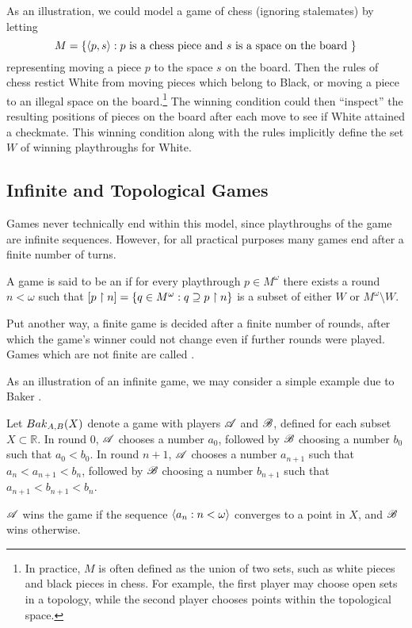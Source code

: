 As an illustration, we could model a game of chess (ignoring stalemates)
by letting
\[
  M = \{\langle p,s\rangle: p \text{ is a chess piece and }
                 s \text{ is a space on the board } \}
\]
representing moving a piece $p$ to the space $s$ on the board. Then the
rules of chess restict White from moving pieces which belong to
Black, or moving a piece to an illegal space on the board.\footnote{
  In practice, $M$ is often defined as the union of two sets, such
  as white pieces and black pieces in chess. For example,
  the first player may choose open sets in a topology, while the second player
  chooses points within the topological space.
}
The winning condition could then
``inspect'' the resulting positions of pieces on the board after each move
to see if White attained a
checkmate. This winning condition along with the rules implicitly define the
set $W$ of winning playthroughs for White.


\subsection{Infinite and Topological Games}

Games never technically end within this model, since
playthroughs of the game are infinite sequences. However, for all practical
purposes many games end after a finite number of turns.

\begin{defn}
  A game is said to be an  if for every playthrough
  $p\in M^\omega$ there exists a round $n<\omega$ such that
    $
      [p\restriction n] = \{q\in M^\omega : q\supseteq p\restriction n \}
    $
  is a subset of either $W$ or $M^\omega\setminus W$.
\end{defn}

Put another way, a finite game is decided after a finite number
of rounds, after which the game's winner could not change even if further
rounds were played.
Games which are not finite are called .

As an illustration of an infinite game, we may consider a simple example due to
Baker \cite{noMRbaker}.

\begin{game}
  Let ${Bak}_{A,B}(X)$ denote a game with players $\mathscr{A}$ and $\mathscr{B}$,
  defined for each subset $X\subset \mathbb{R}$.
  In round $0$, $\mathscr{A}$ chooses a number $a_0$, followed by $\mathscr{B}$ choosing
  a number $b_0$ such that $a_0<b_0$.
  In round $n+1$, $\mathscr{A}$ chooses a number $a_{n+1}$ such that
  $a_n<a_{n+1}<b_n$, followed by $\mathscr{B}$ choosing a number $b_{n+1}$ such that
  $a_{n+1}<b_{n+1}<b_n$.

  $\mathscr{A}$ wins the game if the sequence $\langle a_n:n<\omega\rangle$ converges to a
  point in $X$, and $\mathscr{B}$ wins otherwise.
\end{game}

